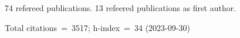 74 refereed publications. 13 refeered publications as first author.

Total citations~=~3517; h-index~=~34 (2023-09-30)